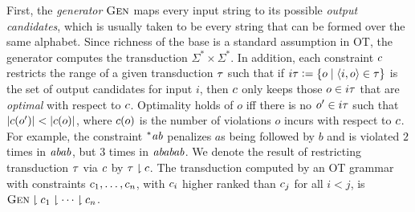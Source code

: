 First, the \emph{generator} $\textsc{Gen}$ maps every input string to its possible \emph{output candidates}, which is usually taken to be every string that can be formed over the same alphabet.
Since richness of the base is a standard assumption in OT, the generator computes the transduction $\Sigma^* \times \Sigma^*$.
In addition, each constraint $c$ restricts the range of a given transduction $\tau$ such that if $i\tau \mathrel{\mathop:}= \left \{  o \mid \left \langle i,o \right \rangle  \in \tau  \right \}$ is the set of output candidates for input $i$, then $c$ only keeps those $o \in i\tau$ that are \emph{optimal} with respect to $c$.
Optimality holds of $o$ iff there is no $o' \in i\tau$ such that $| c(o') | < | c(o) |$, where $c(o)$ is the number of violations $o$ incurs with respect to $c$.
For example, the constraint $^*\mathit{ab}$ penalizes $a$s being followed by $b$ and is violated $2$ times in $\mathit{abab}$, but $3$ times in $\mathit{ababab}$.
We denote the result of restricting transduction $\tau$ via $c$ by $\tau \downharpoonright c$.
The transduction computed by an OT grammar with constraints $c_1, \ldots, c_n$, with $c_i$ higher ranked than $c_j$ for all $i < j$, is $\textsc{Gen} \downharpoonright c_1 \downharpoonright \cdots \downharpoonright c_n$.
%
